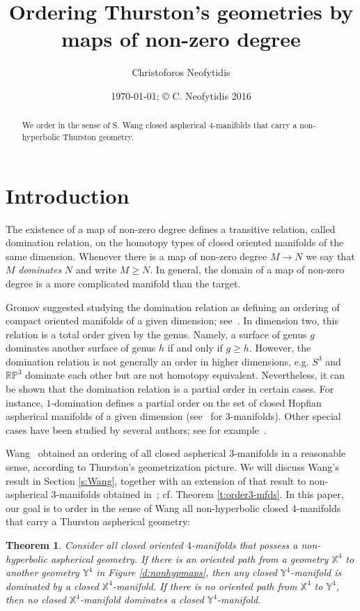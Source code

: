 \documentclass[12pt]{amsart}
\title[Ordering Thurston's geometries by maps of non-zero degree]{Ordering Thurston's geometries by maps of non-zero degree}
\author{Christoforos Neofytidis}
\date{\today; \copyright{ C. Neofytidis 2016}}
\newtheorem{thm}{Theorem}[section]
\theoremstyle{remark}
\begin{document}
\maketitle

\begin{abstract}
We order in the sense of S. Wang closed aspherical $4$-manifolds that carry a non-hyperbolic Thurston geometry.
\end{abstract}

\section{Introduction}

The existence of a map of non-zero degree defines a transitive relation, called domination relation, on the homotopy types of closed oriented manifolds of the same dimension. Whenever there is a map of non-zero degree $M\longrightarrow N$ we say that $M$ {\em dominates} $N$ and write $M\geq N$. In general, the domain of a map of non-zero degree is a more complicated manifold than the target.

Gromov suggested studying the domination relation as defining an ordering of compact oriented manifolds of a given dimension; see~\cite[pg. 1]{CarlsonToledo}. In dimension two, this relation is a total order given by the genus. Namely, a surface of genus $g$ dominates another surface of genus $h$ if and only if $g\geq h$. However, the domination relation is not generally an order in higher dimensions, e.g. $S^3$ and $\mathbb{RP}^3$ dominate each other but are not homotopy equivalent. Nevertheless, it can be shown that the domination relation is a partial order in certain cases. For instance, $1$-domination defines a partial order on the set of closed Hopfian aspherical manifolds of a given dimension (see~\cite{Rong} for $3$-manifolds). Other special cases have been studied by several authors; see for example~\cite{CarlsonToledo,Bel,BBM}.

Wang~\cite{Wang:3-mfdsasp} obtained an ordering of all closed aspherical $3$-manifolds in a reasonable sense, according to Thurston's geometrization picture. We will discuss Wang's result in Section \ref{s:Wang}, together with an extension of that result to non-aspherical $3$-manifolds obtained in~\cite{KotschickNeofytidis}; cf. Theorem \ref{t:order3-mfds}. In this paper, our goal is to order in the sense of Wang all non-hyperbolic closed $4$-manifolds that carry a Thurston aspherical geometry:

\begin{thm}\label{t:order4}
 Consider all closed oriented $4$-manifolds that possess a non-hyperbolic aspherical geometry. If there is an oriented path from a geometry $\mathbb{X}^4$
to another geometry $\mathbb{Y}^4$ in Figure \ref{d:nonhypmaps}, then any closed $\mathbb{Y}^4$-manifold is dominated by a closed $\mathbb{X}^4$-manifold.
If there is no oriented path from $\mathbb{X}^4$ to $\mathbb{Y}^4$, then no closed $\mathbb{X}^4$-manifold dominates a closed $\mathbb{Y}^4$-manifold.
\end{thm}
\end{document}
